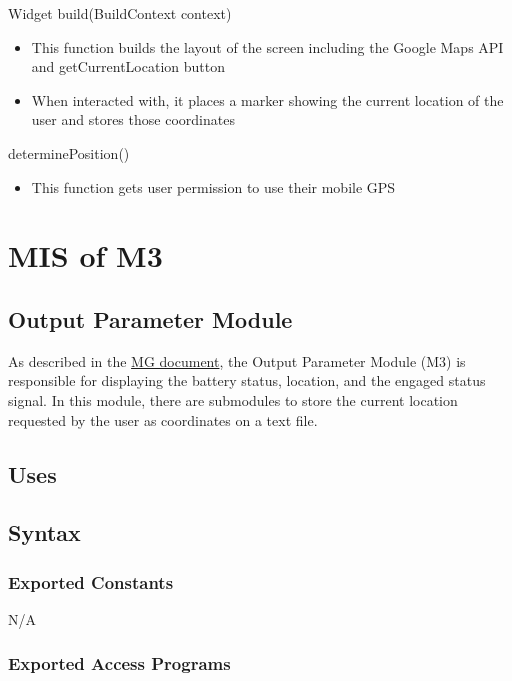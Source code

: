 \documentclass[12pt, titlepage]{article}
\begin{document}
\noindent Widget build(BuildContext context)
\begin{itemize}
\item This function builds the layout of the screen including the Google Maps API and getCurrentLocation button
\item When interacted with, it places a marker showing the current location of the user and stores those coordinates
\end{itemize}

\noindent determinePosition()
\begin{itemize}
\item This function gets user permission to use their mobile GPS
\end{itemize}



\section{MIS of M3} \label{OutputParameters} 

\subsection{Output Parameter Module}

As described in the \href{https://github.com/NevoAbigail/Capstone/blob/main/docs/Design/SoftArchitecture/MG.pdf}{MG document}, the Output Parameter Module (M3) is responsible for displaying the battery status, location, and the engaged status signal. In this module, there are submodules to store the current location requested by the user as coordinates on a text file. 

\subsection{Uses}


\subsection{Syntax}

\subsubsection{Exported Constants}

N/A

\subsubsection{Exported Access Programs}
\end{document}
